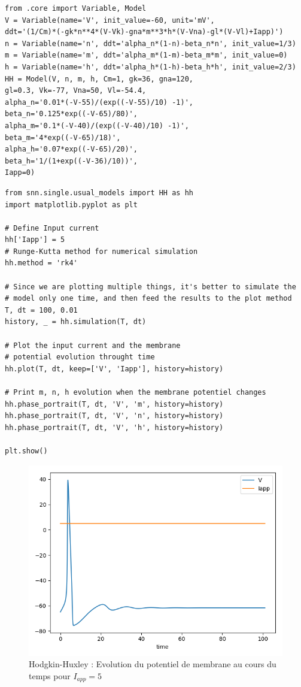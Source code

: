 \documentclass[12pt]{scrartcl}
\begin{document}
\begin{lstlisting}[caption = {Hodgkin-Huxley : Définition du modèle}]
from .core import Variable, Model
V = Variable(name='V', init_value=-60, unit='mV',
ddt='(1/Cm)*(-gk*n**4*(V-Vk)-gna*m**3*h*(V-Vna)-gl*(V-Vl)+Iapp)')
n = Variable(name='n', ddt='alpha_n*(1-n)-beta_n*n', init_value=1/3)
m = Variable(name='m', ddt='alpha_m*(1-m)-beta_m*m', init_value=0)
h = Variable(name='h', ddt='alpha_h*(1-h)-beta_h*h', init_value=2/3)
HH = Model(V, n, m, h, Cm=1, gk=36, gna=120, 
gl=0.3, Vk=-77, Vna=50, Vl=-54.4, 
alpha_n='0.01*(-V-55)/(exp((-V-55)/10) -1)', 
beta_n='0.125*exp((-V-65)/80)',
alpha_m='0.1*(-V-40)/(exp((-V-40)/10) -1)', 
beta_m='4*exp((-V-65)/18)',
alpha_h='0.07*exp((-V-65)/20)',
beta_h='1/(1+exp((-V-36)/10))', 
Iapp=0)
\end{lstlisting}

\begin{lstlisting}[caption = {Hodgkin-Huxley : Simulation du modèle pour $I_{app} = 5$}]
from snn.single.usual_models import HH as hh
import matplotlib.pyplot as plt

# Define Input current
hh['Iapp'] = 5
# Runge-Kutta method for numerical simulation
hh.method = 'rk4'

# Since we are plotting multiple things, it's better to simulate the
# model only one time, and then feed the results to the plot method
T, dt = 100, 0.01
history, _ = hh.simulation(T, dt)

# Plot the input current and the membrane 
# potential evolution throught time
hh.plot(T, dt, keep=['V', 'Iapp'], history=history)

# Print m, n, h evolution when the membrane potentiel changes
hh.phase_portrait(T, dt, 'V', 'm', history=history)
hh.phase_portrait(T, dt, 'V', 'n', history=history)
hh.phase_portrait(T, dt, 'V', 'h', history=history)

plt.show()
\end{lstlisting}



\begin{figure}[!h]
\centering
\includegraphics[scale=0.5]{imgs/hh11.png}
\caption{Hodgkin-Huxley : Evolution du potentiel de membrane au cours du temps pour $I_{app} = 5$}
\label{hh11}
\end{figure}
\end{document}
